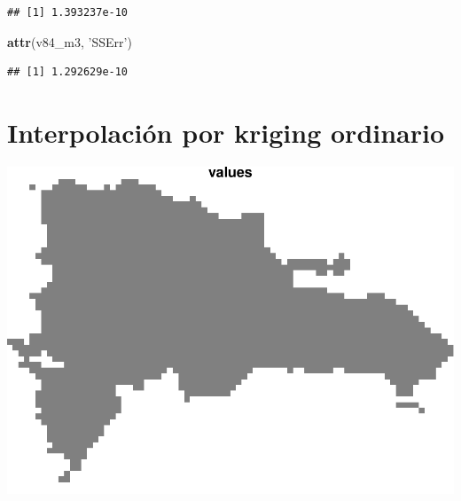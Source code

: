 \documentclass[11pt,]{article}
\newenvironment{Shaded}{\begin{snugshade}}{\end{snugshade}}
\newcommand{\KeywordTok}[1]{\textcolor[rgb]{0.13,0.29,0.53}{\textbf{#1}}}
\newcommand{\DataTypeTok}[1]{\textcolor[rgb]{0.13,0.29,0.53}{#1}}
\newcommand{\DecValTok}[1]{\textcolor[rgb]{0.00,0.00,0.81}{#1}}
\newcommand{\StringTok}[1]{\textcolor[rgb]{0.31,0.60,0.02}{#1}}
\newcommand{\OperatorTok}[1]{\textcolor[rgb]{0.81,0.36,0.00}{\textbf{#1}}}
\newcommand{\NormalTok}[1]{#1}
\begin{document}
\begin{verbatim}
## [1] 1.393237e-10
\end{verbatim}

\begin{Shaded}
\begin{Highlighting}[]
\KeywordTok{attr}\NormalTok{(v84_m3, }\StringTok{'SSErr'}\NormalTok{)}
\end{Highlighting}
\end{Shaded}

\begin{verbatim}
## [1] 1.292629e-10
\end{verbatim}

\section{Interpolación por kriging
ordinario}\label{interpolaciuxf3n-por-kriging-ordinario}

\begin{Shaded}
\end{Shaded}

\includegraphics{proyecto_files/figure-latex/unnamed-chunk-37-1.pdf}
\end{document}
